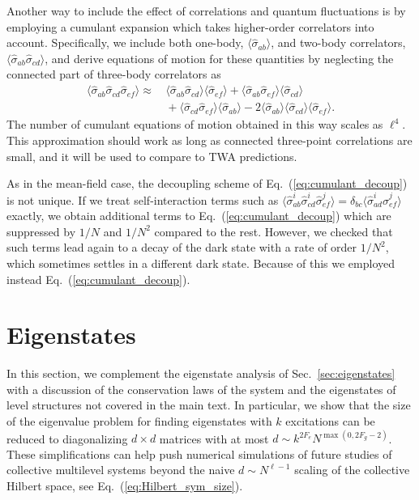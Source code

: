 \documentclass[aps,prx,superscriptaddress,twocolumn,notitlepage,nofootinbib,longbibliography]{revtex4-2}
\begin{document}
Another way to include the effect of correlations and quantum fluctuations is by employing a cumulant expansion which takes higher-order correlators into account.
Specifically, we include both one-body, $\langle \hat{\sigma}_{ab} \rangle$, and two-body correlators, $\langle \hat{\sigma}_{ab} \hat{\sigma}_{cd} \rangle$, and derive equations of motion for these quantities by neglecting the connected part of three-body correlators as
\begin{align}
    \langle \hat{\sigma}_{ab} \hat{\sigma}_{cd} \hat{\sigma}_{ef} \rangle\approx&\, \langle \hat{\sigma}_{ab} \hat{\sigma}_{cd} \rangle \langle \hat{\sigma}_{ef} \rangle + \langle \hat{\sigma}_{ab} \hat{\sigma}_{ef} \rangle \langle \hat{\sigma}_{cd} \rangle \nonumber\\
    &\,+ \langle \hat{\sigma}_{cd} \hat{\sigma}_{ef} \rangle \langle \hat{\sigma}_{ab} \rangle - 2 \langle \hat{\sigma}_{ab} \rangle \langle \hat{\sigma}_{cd} \rangle \langle \hat{\sigma}_{ef} \rangle.
\label{eq:cumulant_decoup}
\end{align}
The number of cumulant equations of motion obtained in this way scales as $\ell^4$. This approximation should work as long as connected three-point correlations are small, and it will be used to compare to TWA predictions. 

As in the mean-field case, the decoupling scheme of Eq.~(\ref{eq:cumulant_decoup}) is not unique.
If we treat self-interaction terms such as $\langle \hat{\sigma}^i_{ab} \hat{\sigma}^i_{cd} \hat{\sigma}^j_{ef} \rangle = \delta_{bc} \langle \hat{\sigma}^i_{ad} \hat{\sigma}^j_{ef} \rangle$ exactly, we obtain additional terms to Eq.~(\ref{eq:cumulant_decoup}) which are suppressed by $1/N$ and $1/N^2$ compared to the rest. However, we checked that such terms lead again to a decay of the dark state with a rate of order $1/N^2$, which sometimes settles in a different dark state. Because of this we employed instead Eq.~(\ref{eq:cumulant_decoup}).







\section{Eigenstates\label{app:eigenstates}}

In this section, we complement the eigenstate analysis of Sec.~\ref{sec:eigenstates} with a discussion of the conservation laws of the system and the eigenstates of level structures not covered in the main text. In particular, we show that the size of the eigenvalue problem for finding eigenstates with $k$ excitations can be reduced to diagonalizing $d\times d$ matrices with at most $d\sim k^{2F_e}N^{\max(0,2F_g-2)}$.
These simplifications can help push numerical simulations of future studies of collective multilevel systems beyond the naive $d\sim N^{\ell-1}$ scaling of the collective Hilbert space, see Eq.~(\ref{eq:Hilbert_sym_size}).
\end{document}
